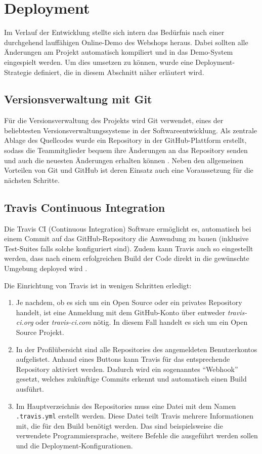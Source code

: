 \section{Deployment} \thispagestyle{nomarkstyle}
Im Verlauf der Entwicklung stellte sich intern das Bedürfnis nach einer durchgehend lauffähigen Online-Demo des Webshops heraus. Dabei sollten alle Änderungen am Projekt automatisch kompiliert und in das Demo-System eingespielt werden. Um dies umsetzen zu können, wurde eine Deployment-Strategie definiert, die in diesem Abschnitt näher erläutert wird.

\subsection{Versionsverwaltung mit Git}
Für die Versionsverwaltung des Projekts wird Git verwendet, eines der beliebtesten Versionsverwaltungssysteme in der Softwareentwicklung. Als zentrale Ablage des Quellcodes wurde ein Repository in der GitHub-Plattform erstellt, sodass die Teammitglieder bequem ihre Änderungen an das Repository senden und auch die neuesten Änderungen erhalten können \cite{Coutermarsh2014}. Neben den allgemeinen Vorteilen von Git und GitHub ist deren Einsatz auch eine Voraussetzung für die nächsten Schritte.

\subsection{Travis Continuous Integration}
Die Travis CI (Continuous Integration) Software ermöglicht es, automatisch bei einem Commit auf das GitHub-Repository die Anwendung zu bauen (inklusive Test-Suites falls solche konfiguriert sind). Zudem kann Travis auch so eingestellt werden, dass nach einem erfolgreichen Build der Code direkt in die gewünschte Umgebung deployed wird \cite{Coutermarsh2014}.

Die Einrichtung von Travis ist in wenigen Schritten erledigt:
\begin{enumerate}
	\item Je nachdem, ob es sich um ein Open Source oder ein privates Repository handelt, ist eine Anmeldung mit dem GitHub-Konto über entweder \textit{travis-ci.org} oder \textit{travis-ci.com} nötig. In diesem Fall handelt es sich um ein Open Source Projekt.
	\item In der Profilübersicht sind alle Repositories des angemeldeten Benutzerkontos aufgelistet. Anhand eines Buttons kann Travis für das entsprechende Repository aktiviert werden. Dadurch wird ein sogenanntes \enquote{Webhook} gesetzt, welches zukünftige Commits erkennt und automatisch einen Build ausführt.
	\item Im Hauptverzeichnis des Repositories muss eine Datei mit dem Namen \texttt{.travis.yml} erstellt werden. Diese Datei teilt Travis mehrere Informationen mit, die für den Build benötigt werden. Das sind beispielsweise die verwendete Programmiersprache, weitere Befehle die ausgeführt werden sollen und die Deployment-Konfigurationen.
\end{enumerate}

